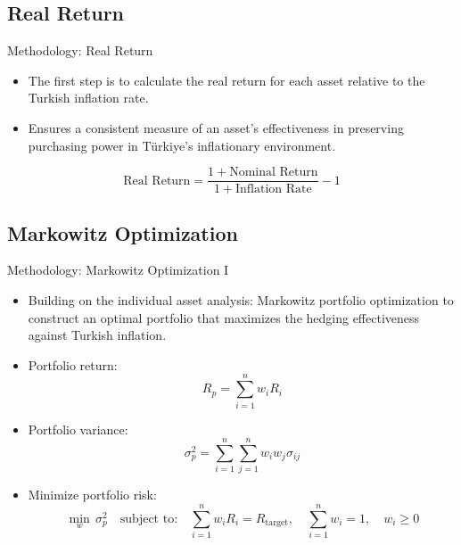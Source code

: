 \documentclass{beamer}
\begin{document}
\subsection{Real Return}
\begin{frame}{Methodology: Real Return}

\begin{itemize}
\item The first step is to calculate the real return for each asset relative to the Turkish inflation rate. 
\item Ensures a consistent measure of an asset's effectiveness in preserving purchasing power in Türkiye's inflationary environment.
\end{itemize}

\[
\text{Real Return} = \frac{1 + \text{Nominal Return}}{1 + \text{Inflation Rate}} - 1
\]
\end{frame}

\subsection{Markowitz Optimization}
\begin{frame}{Methodology: Markowitz Optimization I}
\begin{itemize}
\item Building on the individual asset analysis: Markowitz portfolio optimization to construct an optimal portfolio that maximizes the hedging effectiveness against Turkish inflation.
\item Portfolio return: \[
R_p = \sum_{i=1}^{n} w_i R_i
\]
\item Portfolio variance: \[
\sigma_p^2 = \sum_{i=1}^{n} \sum_{j=1}^{n} w_i w_j \sigma_{ij}
\]
\item Minimize portfolio risk: \[
\min_{w} \, \sigma_p^2 \quad \text{subject to:} \quad \sum_{i=1}^{n} w_i R_i = R_{\text{target}}, \quad \sum_{i=1}^{n} w_i = 1, \quad w_i \geq 0
\]
\end{itemize}
\end{frame}
\end{document}
